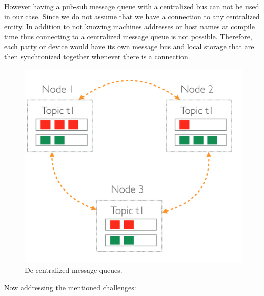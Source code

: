 \noindent However having a pub-sub message queue with a centralized bus can not be used in our case. Since we do not assume that we have a connection to any centralized entity. In addition to not knowing machines addresses or host names at compile time thus connecting to a centralized message queue is not possible. Therefore, each party or device would have its own message bus and local storage that are then synchronized together whenever there is a connection.

\begin{figure}[H]
	\centering
	\includegraphics[scale=0.3]{images/de-message-queues.png}
	\caption{De-centralized message queues.}
	\label{fig:de-message-queues}
\end{figure}
 Now addressing the mentioned challenges:

